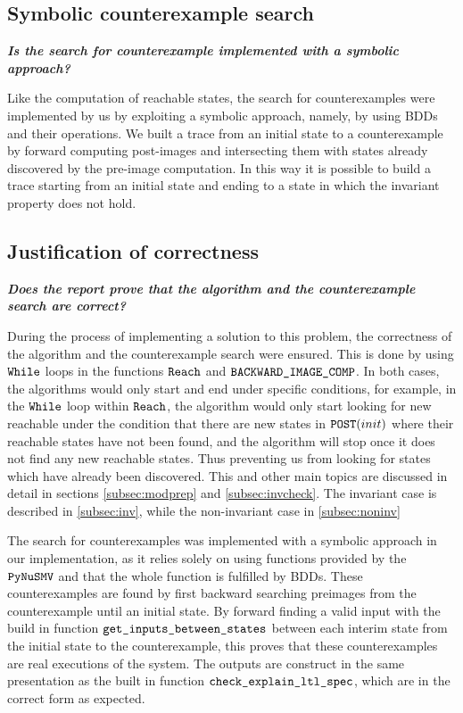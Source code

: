 \subsection{Symbolic counterexample search}
\textbf{\textit{Is the search for counterexample implemented with a symbolic approach?}}

\medskip

Like the computation of reachable states, the search for counterexamples were implemented by us by exploiting a symbolic approach, namely, by using BDDs and their operations. We built a trace from an initial state to a counterexample by forward computing post-images and intersecting them with states already discovered
by the pre-image computation. In this way it is possible to build a trace starting from an initial state and ending to a state in which the invariant property does not hold.

\subsection{Justification of correctness}
\textbf{\textit{Does the report prove that the algorithm and the counterexample search are correct?}}

\medskip

During the process of implementing a solution to this problem, the correctness of the algorithm and the counterexample search were ensured. This is done by using $\verb|While|$ loops in the functions $\verb|Reach|$ and $\verb|BACKWARD_IMAGE_COMP|$. In both cases, the algorithms would only start and end under specific conditions, for example, in the $\verb|While|$ loop within $\verb|Reach|$, the algorithm would only start looking for new reachable under the condition that there are new states in $\verb|POST|(init)$ where their reachable states have not been found, and the algorithm will stop once it does not find any new reachable states. Thus preventing us from looking for states which have already been discovered. This and other main topics are discussed in detail in sections \ref{subsec:modprep} and \ref{subsec:invcheck}. The invariant case is described in \ref{subsec:inv}, while the non-invariant case in \ref{subsec:noninv}



The search for counterexamples was implemented with a symbolic approach in our implementation, as it relies solely on using functions provided by the $\verb|PyNuSMV|$ and that the whole function is fulfilled by BDDs. These counterexamples are found by first backward searching preimages from the counterexample until an initial state. By forward finding a valid input with the build in function $\verb|get_inputs_between_states|$ between each interim state from the initial state to the counterexample, this proves that these counterexamples are real executions of the system. The outputs are construct in the same presentation as the built in function $\verb|check_explain_ltl_spec|$, which are in the correct form as expected.